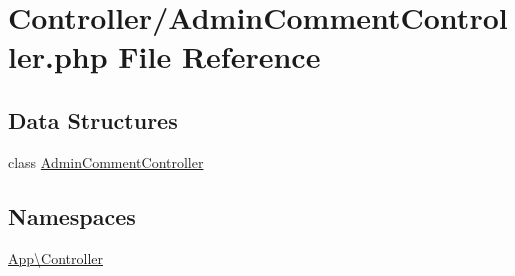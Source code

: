 \hypertarget{_admin_comment_controller_8php}{}\section{Controller/\+Admin\+Comment\+Controller.php File Reference}
\label{_admin_comment_controller_8php}
\subsection*{Data Structures}
\begin{DoxyCompactItemize}
\item 
class \mbox{\hyperlink{class_app_1_1_controller_1_1_admin_comment_controller}{Admin\+Comment\+Controller}}
\end{DoxyCompactItemize}
\subsection*{Namespaces}
\begin{DoxyCompactItemize}
\item 
 \mbox{\hyperlink{namespace_app_1_1_controller}{App\textbackslash{}\+Controller}}
\end{DoxyCompactItemize}
